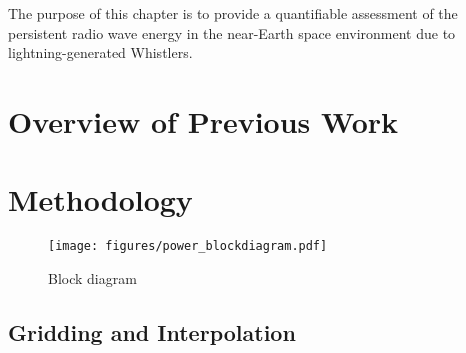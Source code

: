 The purpose of this chapter is to provide a quantifiable assessment of the persistent radio wave energy in the near-Earth space environment due to lightning-generated Whistlers.

\section{Overview of Previous Work}

\section{Methodology}

\begin{figure}[ht]
\begin{center}
\texttt{[image: figures/power\_blockdiagram.pdf]}
\caption{Block diagram}
\label{fig:power_blockdiagram}
\end{center}
\end{figure}

\subsection{Gridding and Interpolation}

